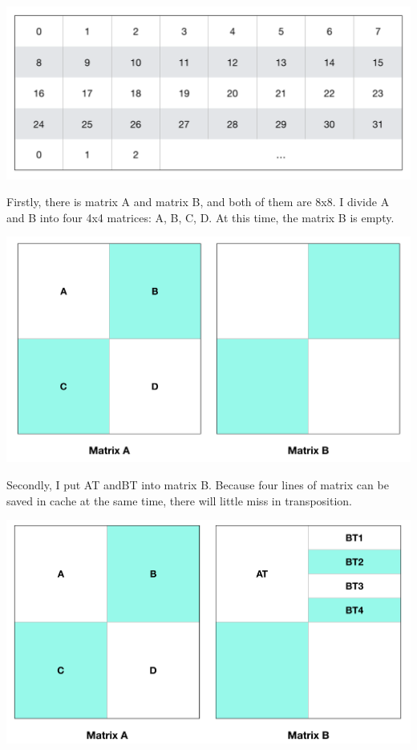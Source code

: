 \documentclass{article}
\begin{document}
\includegraphics[scale=0.35]{3.png}

Firstly, there is matrix A and matrix B, and both of them are 8x8. I divide A and B into four 4x4 matrices: A, B, C, D. At this time, the matrix B is empty.

\includegraphics[scale=0.35]{4.png}

Secondly, I put AT andBT into matrix B. Because four lines of matrix can be saved in cache at the same time, there will little miss in transposition. 

\includegraphics[scale=0.35]{5.png}
\end{document}
